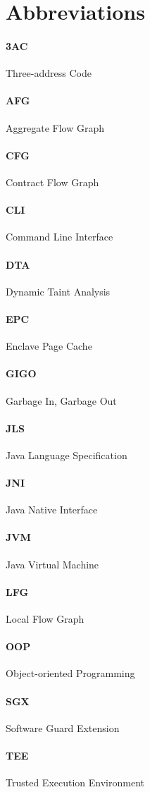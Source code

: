 \section{Abbreviations}\label{sec:abbreviations}

\paragraph{3AC} Three-address Code
\paragraph{AFG} Aggregate Flow Graph
\paragraph{CFG} Contract Flow Graph
\paragraph{CLI} Command Line Interface
\paragraph{DTA} Dynamic Taint Analysis
\paragraph{EPC} Enclave Page Cache
\paragraph{GIGO} Garbage In, Garbage Out
\paragraph{JLS} Java Language Specification
\paragraph{JNI} Java Native Interface
\paragraph{JVM} Java Virtual Machine
\paragraph{LFG} Local Flow Graph
\paragraph{OOP} Object-oriented Programming
\paragraph{SGX} Software Guard Extension
\paragraph{TEE} Trusted Execution Environment
